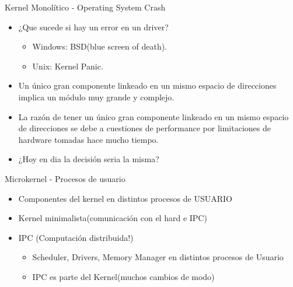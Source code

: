 \begin{frame}{Kernel Monolítico - Operating System Crash}

 \begin{itemize}
    \item ¿Que sucede si hay un error en un driver?
    \begin{itemize}
    	\item Windows: BSD(blue screen of death).
    	\item Unix: Kernel Panic.
    \end{itemize}
    \item Un único gran componente linkeado en un mismo espacio de direcciones implica un módulo muy grande y complejo.
    \item La razón de tener un único gran componente linkeado en un mismo espacio de direcciones se debe a cuestiones de performance por limitaciones de hardware tomadas hace mucho tiempo.
     \item ¿Hoy en dia la decisión seria la misma? 
   \end{itemize} 
\end{frame}


\begin{frame}{Microkernel - Procesos de usuario}
  \begin{center}
   \end{center}
 \begin{itemize}
    \item Componentes del kernel en distintos procesos de USUARIO
    \item Kernel minimalista(comunicación con el hard e IPC)
    \item IPC (Computación distribuida!) 
    \begin{itemize}
            \item \small Scheduler, Drivers, Memory Manager en distintos procesos de Usuario
            \item \small IPC es parte del Kernel(muchos cambios de modo)
         \end{itemize} 
   \end{itemize} 
\end{frame}


